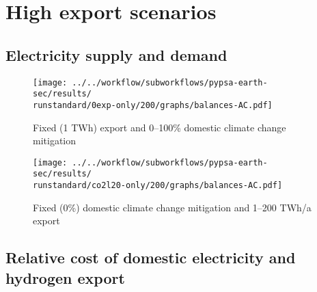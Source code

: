\section{High export scenarios}
\label{sec:highexportsens}
\subsection{Electricity supply and demand}


\begin{figure*}[h!]
    \centering
    \begin{subfigure}[b]{0.49\linewidth}
        \centering
        \texttt{[image: ../../workflow/subworkflows/pypsa-earth-sec/results/\\runstandard/0exp-only/200/graphs/balances-AC.pdf]}
        \caption{Fixed (1 TWh) export and 0--100\% domestic climate change mitigation}
        \label{fig:balances-ac-0exp}
    \end{subfigure}
    \hfill
    \begin{subfigure}[b]{0.49\linewidth}
        \centering
        \texttt{[image: ../../workflow/subworkflows/pypsa-earth-sec/results/\\runstandard/co2l20-only/200/graphs/balances-AC.pdf]}
        \caption{Fixed (0\%) domestic climate change mitigation and 1--200 TWh/a export}
        \label{fig:balances-ac-co2l20-200}
    \end{subfigure}
    \hfill
    \caption{Electricity supply and demand at fixed export levels and increasing domestic climate change mitigation (\ref{fig:balances-ac-0exp}) and vice versa (\ref{fig:balances-ac-co2l20-200}). Increasing domestic climate change mitigation first phases out carbon-intensive coal generation in favor of CCGT, at medium to high domestic climate change mitigation the electricity system is fully renewable supported by flexibility through Vehicle-to-Grid (V2G) and sector coupling. Increasing electricity demands cover EVs and hydrogen generation for other sectors.
    At increasing hydrogen exports the additional electricity required for hydrogen electrolysis is covered by onshore wind and solar PV, as imposed by the temporal hydrogen regulation. 
    }
    \label{fig:balances-ac}
\end{figure*}





\subsection{Relative cost of domestic electricity and hydrogen export}

